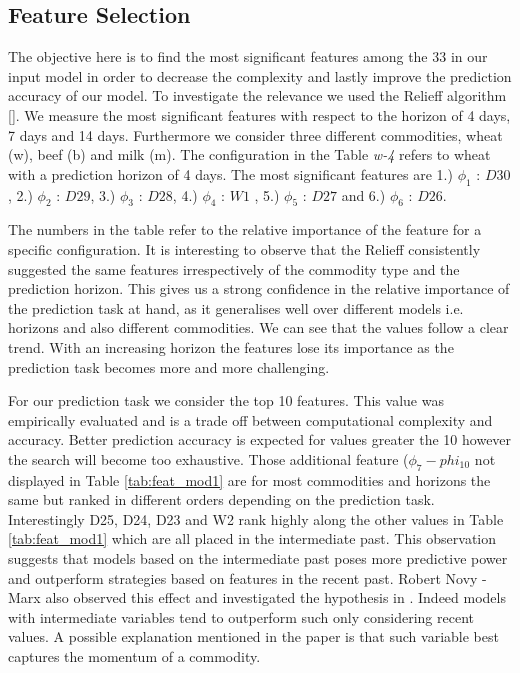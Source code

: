 \subsection{Feature Selection}
\label{featSel_bench}


The objective here is to find the most significant features among the 33 in our input model in order to decrease the complexity and lastly improve the prediction accuracy of our model.  To investigate the relevance we used the Relieff algorithm []. We measure the most significant features with respect to the horizon of 4 days, 7 days and 14 days. Furthermore we consider  three different commodities, wheat (w), beef (b) and milk (m). The configuration in the Table \emph{w-4} refers to wheat with a prediction horizon of 4 days. The most significant features are  1.) $\phi_1$ : $D30$ , 2.) $\phi_2$ : $D29$,  3.) $\phi_3$ : $D28$, 4.) $\phi_4$ : $W1$ , 5.) $\phi_5$ : $D27$ and 6.) $\phi_6$ : $D26$.

The numbers in the table refer to the relative importance of the feature for a specific configuration. It is interesting to observe that the Relieff consistently suggested the same features irrespectively of the commodity type and the prediction horizon. This gives us a strong confidence in the relative importance of the prediction task at hand, as it generalises well over different models i.e. horizons and also different commodities. We can see that the values follow a clear trend. With an increasing horizon the features lose its importance as the prediction task becomes more and more challenging. 


For our prediction task we consider the top 10 features. This value was empirically evaluated and is a trade off between computational complexity and accuracy. Better prediction accuracy is expected for values greater the 10 however the search will become too exhaustive.  Those additional feature ($\phi_7 - phi_10$ not displayed in Table \ref{tab:feat_mod1}  are for most commodities and horizons the same but ranked in different orders depending on the prediction task. Interestingly D25, D24, D23 and W2 rank highly along the other values in Table \ref{tab:feat_mod1} which are all placed in the intermediate past. This observation suggests that models based on the intermediate past poses more predictive power and outperform strategies based on features in the recent past. Robert Novy - Marx also observed this effect and investigated the hypothesis in \cite{iuj11}. Indeed models with intermediate variables tend to outperform such only considering recent values. A possible explanation mentioned in the paper is that such variable best captures the momentum of a commodity. 




